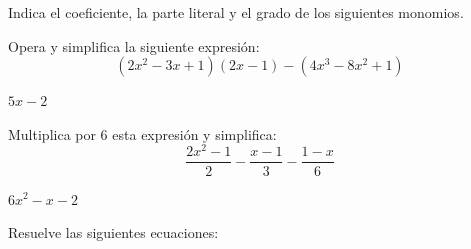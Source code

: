 \documentclass[addpoints,spanish, 12pt,a4paper]{exam}
\begin{document}
\begin{questions}

\question Indica el coeficiente, la parte literal y el grado de los siguientes monomios.
 

\addpoints


\question [2] Opera y simplifica la siguiente expresión: $$\left(2x^2-3x+1\right)\left(2x-1\right)-\left(4x^3-8x^2+1\right) $$
\begin{solution}
$5x-2$
\end{solution}

\question [2] Multiplica por 6 esta expresión y simplifica: $$\dfrac{2x^2-1}{2}-\dfrac{x-1}{3}-\dfrac{1-x}{6}$$
\begin{solution}
$ 6x^2-x-2$
\end{solution}

\question  Resuelve las siguientes ecuaciones:
\end{questions}
\end{document}
